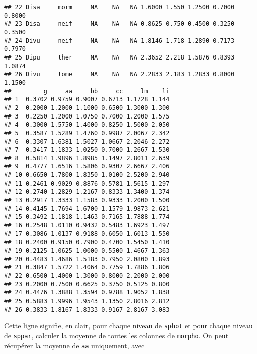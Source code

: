 \begin{knitrout}
\begin{kframe}
\begin{verbatim}
## 22 Disa     morm     NA    NA   NA 1.6000 1.550 1.2500 0.7000 0.8000
## 23 Disa     neif     NA    NA   NA 0.8625 0.750 0.4500 0.3250 0.3500
## 24 Divu     neif     NA    NA   NA 1.8146 1.718 1.2890 0.7173 0.7970
## 25 Dipu     ther     NA    NA   NA 2.3652 2.218 1.5876 0.8393 1.0874
## 26 Divu     tome     NA    NA   NA 2.2833 2.183 1.2833 0.8000 1.1500
##         g     aa     bb     cc     lm    li
## 1  0.3702 0.9759 0.9007 0.6713 1.1728 1.144
## 2  0.2000 1.2000 1.1000 0.6500 1.3000 1.300
## 3  0.2250 1.2000 1.0750 0.7000 1.2000 1.575
## 4  0.3000 1.5750 1.4000 0.8250 1.5000 2.050
## 5  0.3587 1.5289 1.4760 0.9987 2.0067 2.342
## 6  0.3307 1.6381 1.5027 1.0667 2.2046 2.272
## 7  0.3417 1.1833 1.0250 0.7000 1.2667 1.530
## 8  0.5814 1.9896 1.8985 1.1497 2.8011 2.639
## 9  0.4777 1.6516 1.5806 0.9307 2.6667 2.406
## 10 0.6650 1.7800 1.8350 1.0100 2.5200 2.940
## 11 0.2461 0.9029 0.8876 0.5781 1.5615 1.297
## 12 0.2740 1.2829 1.2167 0.8333 1.3400 1.374
## 13 0.2917 1.3333 1.1583 0.9333 1.2000 1.500
## 14 0.4145 1.7694 1.6700 1.1579 1.9873 2.621
## 15 0.3492 1.1818 1.1463 0.7165 1.7888 1.774
## 16 0.2548 1.0110 0.9432 0.5483 1.6923 1.497
## 17 0.3086 1.0137 0.9188 0.6050 1.6013 1.550
## 18 0.2400 0.9150 0.7900 0.4700 1.5450 1.410
## 19 0.2125 1.0625 1.0000 0.5500 1.4667 1.363
## 20 0.4483 1.4686 1.5183 0.7950 2.0800 1.893
## 21 0.3847 1.5722 1.4064 0.7759 1.7886 1.806
## 22 0.6500 1.4000 1.3000 0.8000 2.2000 2.000
## 23 0.2000 0.7500 0.6625 0.3750 0.5125 0.800
## 24 0.4476 1.3888 1.3594 0.9788 1.9052 1.838
## 25 0.5883 1.9996 1.9543 1.1350 2.8016 2.812
## 26 0.3833 1.8167 1.8333 0.9167 2.8167 3.083
\end{verbatim}
\end{kframe}
\end{knitrout}


\noindent Cette ligne signifie, en clair, pour chaque niveau de \texttt{sphot} et pour chaque niveau de \texttt{sppar}, calculer la moyenne de toutes les colonnes de \texttt{morpho}. 
On peut récupérer la moyenne de \texttt{aa} uniquement, avec

